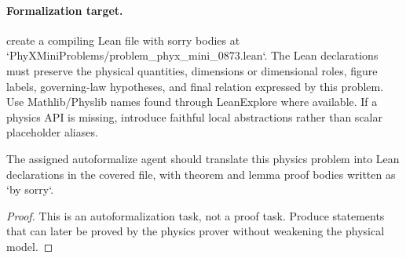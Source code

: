 \paragraph{Formalization target.}
create a compiling Lean file with sorry bodies at `PhyXMiniProblems/problem\_phyx\_mini\_0873.lean`. The Lean declarations must preserve the physical quantities, dimensions or dimensional roles, figure labels, governing-law hypotheses, and final relation expressed by this problem.
Use Mathlib/Physlib names found through LeanExplore where available. If a physics API is missing, introduce faithful local abstractions rather than scalar placeholder aliases.

\begin{theorem}
\label{thm:physics:phyx_mini_0873:target}
The assigned autoformalize agent should translate this physics problem into Lean declarations in the covered file, with theorem and lemma proof bodies written as `by sorry`.
\end{theorem}
\begin{proof}
This is an autoformalization task, not a proof task. Produce statements that can later be proved by the physics prover without weakening the physical model.
\end{proof}

